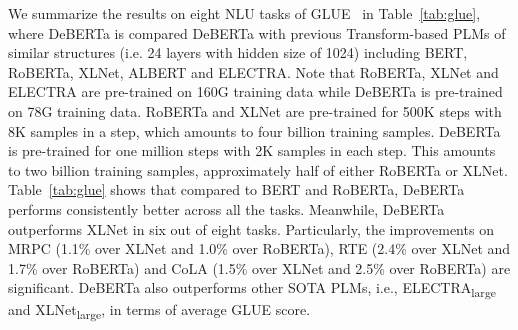 \documentclass{article}
\newcommand\ModelName{DeBERTa}
\begin{document}
We summarize the results on eight NLU tasks of GLUE~\citep{wang2018glue} in Table~\ref{tab:glue}, where DeBERTa is compared {\ModelName} with previous Transform-based PLMs of similar structures (i.e. 24 layers with hidden size of 1024) including BERT, RoBERTa, XLNet, ALBERT and ELECTRA.
Note that RoBERTa, XLNet and ELECTRA are pre-trained on 160G training data while {\ModelName} is pre-trained on 78G training data. RoBERTa and XLNet are pre-trained for 500K steps with 8K samples in a step, which amounts to four billion training samples. 
{\ModelName} is pre-trained for one million steps with 2K samples in each step.  
This amounts to two billion training samples, approximately half of either RoBERTa or XLNet.  
Table~\ref{tab:glue} shows that compared to BERT and RoBERTa, {\ModelName} performs consistently better across all the tasks. 
Meanwhile, {\ModelName} outperforms XLNet in six out of eight tasks. 
Particularly, the improvements on MRPC (1.1\% over XLNet and 1.0\% over RoBERTa), RTE (2.4\% over XLNet and 1.7\% over RoBERTa) and CoLA (1.5\% over XLNet and 2.5\% over RoBERTa) are significant. 
{\ModelName} also outperforms other SOTA PLMs, i.e., ELECTRA\textsubscript{large} and XLNet\textsubscript{large}, in terms of average GLUE score.  
\end{document}
